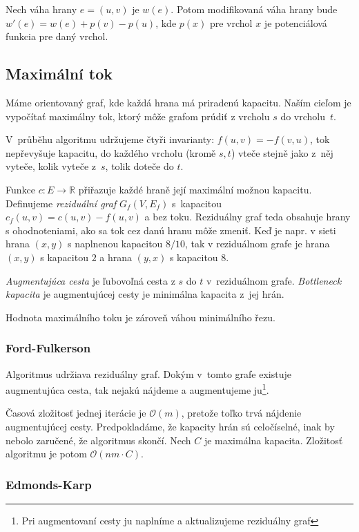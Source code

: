 Nech váha hrany $e=(u,v)$ je $w(e)$. Potom modifikovaná
váha hrany bude $w'(e) = w(e) + p(v) - p(u)$, kde $p(x)$
pre vrchol $x$ je potenciálová funkcia pre daný vrchol.

\subsection{Maximální tok}
Máme orientovaný graf, kde každá hrana má priradenú kapacitu.
Naším cieľom je vypočítať maximálny tok, ktorý môže
grafom prúdiť z vrcholu $s$ do vrcholu~$t$.

V~průběhu algoritmu udržujeme čtyři invarianty:
$f(u,v) = -f(v,u)$, tok nepřevyšuje kapacitu,
do každého vrcholu (kromě $s,t$) vteče stejně jako z~něj vyteče,
kolik vyteče z~$s$, tolik doteče do $t$.

Funkce $c : E \to \mathbb{R}$ přiřazuje každé hraně její maximální
možnou kapacitu. Definujeme {\em reziduální graf}
$G_{f}(V,E_{f})$ s~kapacitou $c_{f}(u,v)=c(u,v)-f(u,v)$ a bez toku.
Reziduálny graf teda obsahuje hrany s ohodnoteniami, ako sa tok
cez danú hranu môže zmeniť. Keď je napr. v sieti hrana $(x,y)$
s naplnenou kapacitou $8/10$, tak v reziduálnom grafe je
hrana $(x,y)$ s kapacitou $2$ a hrana $(y,x)$ s kapacitou $8$.

{\em Augmentujúca cesta} je ľubovoľná cesta z $s$ do $t$
v~reziduálnom grafe. {\em Bottleneck kapacita} je augmentujúcej
cesty je minimálna kapacita z~jej hrán.

\begin{theorem}
Hodnota maximálního toku je zároveň váhou minimálního řezu.
\end{theorem}

\subsubsection{Ford-Fulkerson}
Algoritmus udržiava reziduálny graf. Dokým v~tomto grafe
existuje augmentujúca cesta, tak nejakú nájdeme a 
augmentujeme ju\footnote{Pri augmentovaní cesty ju naplníme 
a aktualizujeme reziduálny graf}.

Časová zložitosť jednej iterácie je $\mathcal{O}(m)$, pretože
toľko trvá nájdenie augmentujúcej cesty. Predpokladáme, že 
kapacity hrán sú celočíselné, inak by nebolo zaručené, že algoritmus skončí. 
Nech $C$ je maximálna kapacita. Zložitosť algoritmu je potom $\mathcal{O}(nm \cdot C)$.

\subsubsection{Edmonds-Karp}

